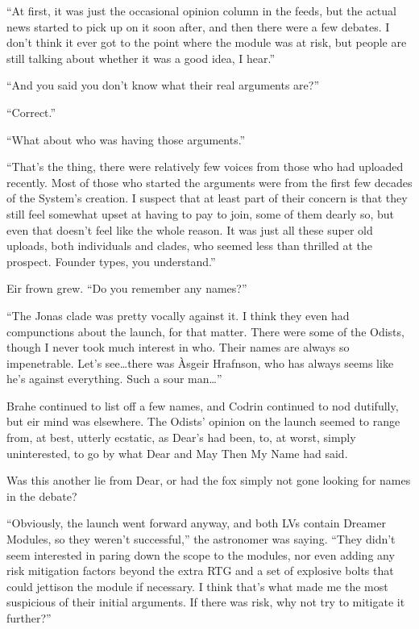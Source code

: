 ``At first, it was just the occasional opinion column in the feeds, but the actual news started to pick up on it soon after, and then there were a few debates. I don't think it ever got to the point where the module was at risk, but people are still talking about whether it was a good idea, I hear.''

``And you said you don't know what their real arguments are?''

``Correct.''

``What about who was having those arguments.''

``That's the thing, there were relatively few voices from those who had uploaded recently. Most of those who started the arguments were from the first few decades of the System's creation. I suspect that at least part of their concern is that they still feel somewhat upset at having to pay to join, some of them dearly so, but even that doesn't feel like the whole reason. It was just all these super old uploads, both individuals and clades, who seemed less than thrilled at the prospect. Founder types, you understand.''

Eir frown grew. ``Do you remember any names?''

``The Jonas clade was pretty vocally against it. I think they even had compunctions about the launch, for that matter. There were some of the Odists, though I never took much interest in who. Their names are always so impenetrable. Let's see\ldots there was Àsgeir Hrafnson, who has always seems like he's against everything. Such a sour man\ldots{}''

Brahe continued to list off a few names, and Codrin continued to nod dutifully, but eir mind was elsewhere. The Odists' opinion on the launch seemed to range from, at best, utterly ecstatic, as Dear's had been, to, at worst, simply uninterested, to go by what Dear and May Then My Name had said.

Was this another lie from Dear, or had the fox simply not gone looking for names in the debate?

``Obviously, the launch went forward anyway, and both LVs contain Dreamer Modules, so they weren't successful,'' the astronomer was saying. ``They didn't seem interested in paring down the scope to the modules, nor even adding any risk mitigation factors beyond the extra RTG and a set of explosive bolts that could jettison the module if necessary. I think that's what made me the most suspicious of their initial arguments. If there was risk, why not try to mitigate it further?''

